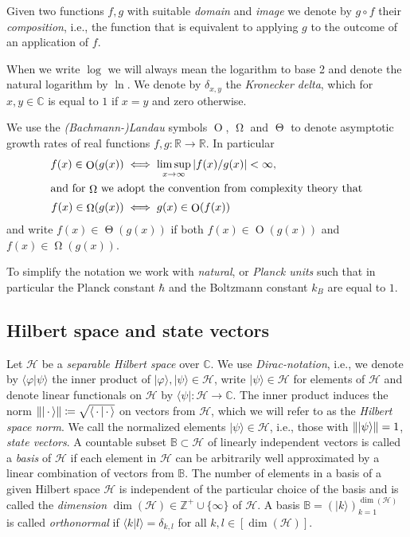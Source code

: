 \documentclass[a4paper,12pt,listof=totoc,index=totoc,bibliography=totoc,headsepline=false,headings=normal,BCOR16.153846mm,DIV12,headinclude,twoside,cleardoublepage=empty,numbers=noenddot,final]{scrreprt}
\theoremstyle{mystyle}
\numberwithin{equation}{section}
\numberwithin{figure}{section}
\numberwithin{lemma}{section}
\numberwithin{theorem}{section}
\numberwithin{corollary}{section}
\numberwithin{definition}{section}
\numberwithin{conjecture}{section}
\numberwithin{observation}{section}
\newcommand{\+}{\mkern2mu}
\newcommand{\coloneqq}{\mathrel{\vcentcolon\mkern-1.2mu=}} %
\newcommand{\union}{\cup}
\newcommand{\argdot}{{\,\cdot\,}}
\newcommand{\oftype}{\colon}
\newcommand{\Basis}{\mathds{B}}
\newcommand{\bra}[1]{\langle #1|}
\newcommand{\ket}[1]{|#1\rangle}
\newcommand{\braket}[2]{\langle #1 | #2 \rangle}
\newcommand{\norm}[2][]{
  \ifthenelse{\equal{#1}{}}
    {\left\| {#2} \right\|}
    {\ifthenelse{\equal{#1}{uinv}}
      {\left\vert\kern-0.25ex\left\vert\kern-0.25ex\left\vert {#2} \right\vert\kern-0.25ex\right\vert\kern-0.25ex\right\vert}
      {\left\| {#2} \right\|_{#1}}
    }
}
\DeclareMathOperator{\landauO}{O}
\DeclareMathOperator{\landauOmega}{\Omega}
\DeclareMathOperator{\landauTheta}{\Theta}
\DeclareMathOperator{\1}{\mathds{1}}
\newcommand{\mc}[1]{\mathcal{#1}}
\newcommand{\mcH}{\mc{H}}
\newcommand{\mb}[1]{\mathbb{#1}}
\newcommand{\Z}{\mb{Z}}
\newcommand{\R}{\mb{R}}
\renewcommand{\C}{\mb{C}} %
\begin{document}
Given two functions $f,g$ with suitable \emph{domain} and \emph{image} we denote by $g \circ f$ their \emph{composition}, i.e., the function that is equivalent to applying $g$ to the outcome of an application of $f$.

When we write $\log$ we will always mean the logarithm to base 2 and denote the natural logarithm by $\ln$.
We denote by $\delta_{x,y}$ the \emph{Kronecker delta}, which for $x,y \in \C$ is equal to $1$ if $x=y$ and zero otherwise.

We use the \emph{(Bachmann-)Landau} symbols $\landauO$, $\landauOmega$ and $\landauTheta$ to denote asymptotic growth rates of real functions $f,g\oftype\R\to\R$.
In particular
\begin{align}
  f(x) \in \landauO(g(x)) &\iff \limsup_{x\to\infty}|f(x)/g(x)| < \infty ,\\
\intertext{and for $\landauOmega$ we adopt the convention from complexity theory that}
  f(x) \in \landauOmega(g(x)) &\iff g(x) \in \landauO(f(x)) 
\end{align}
and write $f(x) \in \landauTheta(g(x))$ if both $f(x) \in \landauO(g(x))$ and $f(x) \in \landauOmega(g(x))$.

To simplify the notation we work with \emph{natural}, or \emph{Planck units} such that in particular the Planck constant $\hbar$ and the Boltzmann constant $k_B$ are equal to $1$.


\subsection{Hilbert space and state vectors}
\label{sec:hilbertspaceandstatevectos}
%
Let $\mcH$ be a \emph{separable Hilbert space} over $\C$.
We use \emph{Dirac-notation}, i.e., we denote by $\braket\varphi\psi$ the inner product of $\ket\varphi,\ket\psi\in\mcH$, write $\ket\psi \in \mcH$ for elements of $\mcH$ and denote linear functionals on $\mcH$ by $\bra\psi\oftype\mcH\to\C$.
The inner product induces the norm $\norm{\ket\argdot} \coloneqq \sqrt{\braket{\argdot}{\argdot}}$ on vectors from $\mcH$, which we will refer to as the \emph{Hilbert space norm}.
We call the normalized elements $\ket\psi\in\mcH$, i.e., those with $\norm{\ket\psi} = 1$, \emph{state vectors}.
A countable subset $\Basis \subset \mcH$ of linearly independent vectors is called a \emph{basis} of $\mcH$ if each element in $\mcH$ can be arbitrarily well approximated by a linear combination of vectors from $\Basis$.
The number of elements in a basis of a given Hilbert space $\mcH$ is independent of the particular choice of the basis and is called the \emph{dimension} $\dim(\mcH) \in \Z^+ \union \{\infty\}$ of $\mcH$.
A basis $\Basis = (\ket k)_{k=1}^{\dim(\mcH)}$ is called \emph{orthonormal} if $\braket k l = \delta_{k,l}$ for all $k,l\in [\dim(\mcH)]$.
\end{document}
